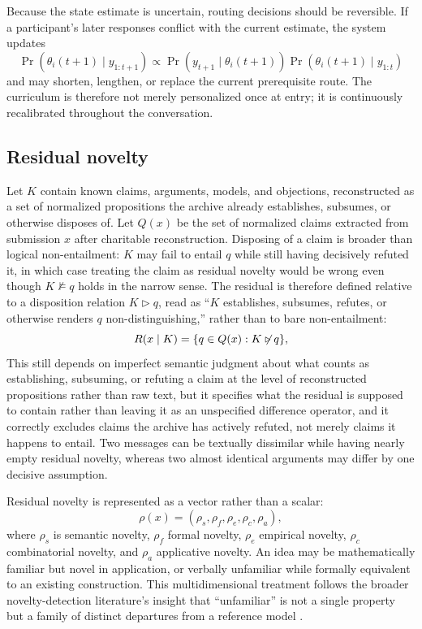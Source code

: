 \documentclass[11pt]{article}
\begin{document}
Because the state estimate is uncertain, routing decisions should be reversible. If a participant's later responses conflict with the current estimate, the system updates
\[
\Pr\!\left(\theta_i(t+1)\mid y_{1:t+1}\right)
\propto
\Pr\!\left(y_{t+1}\mid\theta_i(t+1)\right)
\Pr\!\left(\theta_i(t+1)\mid y_{1:t}\right)
\]
and may shorten, lengthen, or replace the current prerequisite route. The curriculum is therefore not merely personalized once at entry; it is continuously recalibrated throughout the conversation.

\subsection{Residual novelty}

Let $K$ contain known claims, arguments, models, and objections, reconstructed as a set of normalized propositions the archive already establishes, subsumes, or otherwise disposes of. Let $Q(x)$ be the set of normalized claims extracted from submission $x$ after charitable reconstruction. Disposing of a claim is broader than logical non-entailment: $K$ may fail to entail $q$ while still having decisively refuted it, in which case treating the claim as residual novelty would be wrong even though $K \nvDash q$ holds in the narrow sense. The residual is therefore defined relative to a disposition relation $K \mathrel{\triangleright} q$, read as ``$K$ establishes, subsumes, refutes, or otherwise renders $q$ non-distinguishing,'' rather than to bare non-entailment:
\[
R(x \mid K) = \{ q \in Q(x) : K \not\mathrel{\triangleright} q \},
\]
This still depends on imperfect semantic judgment about what counts as establishing, subsuming, or refuting a claim at the level of reconstructed propositions rather than raw text, but it specifies what the residual is supposed to contain rather than leaving it as an unspecified difference operator, and it correctly excludes claims the archive has actively refuted, not merely claims it happens to entail. Two messages can be textually dissimilar while having nearly empty residual novelty, whereas two almost identical arguments may differ by one decisive assumption.

Residual novelty is represented as a vector rather than a scalar:
\[
\rho(x) = (\rho_s, \rho_f, \rho_e, \rho_c, \rho_a),
\]
where $\rho_s$ is semantic novelty, $\rho_f$ formal novelty, $\rho_e$ empirical novelty, $\rho_c$ combinatorial novelty, and $\rho_a$ applicative novelty. An idea may be mathematically familiar but novel in application, or verbally unfamiliar while formally equivalent to an existing construction. This multidimensional treatment follows the broader novelty-detection literature's insight that ``unfamiliar'' is not a single property but a family of distinct departures from a reference model \cite{markou2003a,markou2003b}.
\end{document}
